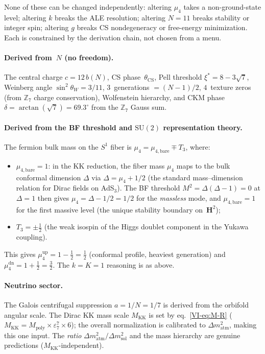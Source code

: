 None of these can be changed independently:
altering $\mu_4$ takes a non-ground-state level;
altering $k$ breaks the ALE resolution;
altering $N = 11$ breaks stability or integer spin;
altering $g$ breaks CS nondegeneracy or free-energy
minimization.
Each is constrained by the derivation chain, not
chosen from a menu.

\paragraph{Derived from~$N$ (no freedom).}
The central charge $c = 12\,b(N)$, CS phase~$\theta_{\mathrm{CS}}$,
Pell threshold $\xi^* = 8 {-} 3\sqrt{7}$,
Weinberg angle $\sin^2\theta_W = 3/11$,
$3$~generations $= (N{-}1)/2$,
$4$~texture zeros (from $\mathbb{Z}_7$ charge conservation),
Wolfenstein hierarchy,
and CKM phase $\delta = \arctan(\sqrt{7}) = 69.3^\circ$ from the $\mathbb{Z}_7$ Gauss sum.

\paragraph{Derived from the BF threshold and $\mathrm{SU}(2)$ representation theory.}
The fermion bulk mass on the $S^1$ fiber is
$\mu_4 = \mu_{4,\mathrm{bare}} \mp T_3$, where:
\begin{itemize}
\item $\mu_{4,\mathrm{bare}} = 1$: in the KK reduction, the fiber mass
  $\mu_4$ maps to the bulk conformal dimension $\Delta$ via $\Delta = \mu_4 + 1/2$
  (the standard mass--dimension relation for Dirac fields on
  AdS$_3$).
  The BF threshold $M^2 = \Delta(\Delta{-}1) = 0$ at $\Delta = 1$ then gives
  $\mu_4 = \Delta - 1/2 = 1/2$ for the \emph{massless} mode, and
  $\mu_{4,\mathrm{bare}} = 1$ for the first massive level
  (the unique stability boundary on~$\mathbf{H}^2$);
\item $T_3 = \pm\tfrac{1}{2}$ (the weak isospin of the Higgs doublet
  component in the Yukawa coupling).
\end{itemize}
This gives $\mu_4^{\mathrm{up}} = 1 - \tfrac{1}{2} = \tfrac{1}{2}$
(conformal profile, heaviest generation) and
$\mu_4^{\mathrm{dn}} = 1 + \tfrac{1}{2} = \tfrac{3}{2}$.
The $k = K = 1$ reasoning is as above.

\paragraph{Neutrino sector.}
The Galois centrifugal suppression $a = 1/N = 1/7$ is derived from the
orbifold angular scale.
The Dirac KK mass scale $M_{\mathrm{KK}}$ is set by eq.~\eqref{VI-eq:M-R}
($M_{\mathrm{KK}} = M_{\mathrm{poly}} \times \varepsilon_7^7 \times 6$);
the overall normalization is calibrated to
$\Delta m^2_{\mathrm{atm}}$, making this one input.
The \emph{ratio} $\Delta m^2_{\mathrm{atm}}/\Delta m^2_{\mathrm{sol}}$
and the mass hierarchy are genuine predictions
($M_{\mathrm{KK}}$-independent).

